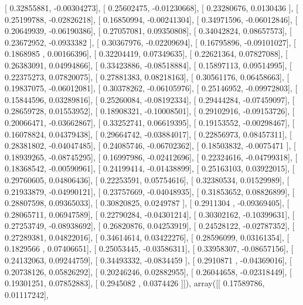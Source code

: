 \documentclass{article}
\begin{document}
       [ 0.32855881, -0.00304273],
       [ 0.25602475, -0.01230668],
       [ 0.23280676,  0.0130436 ],
       [ 0.25199788, -0.02826218],
       [ 0.16850994, -0.00241304],
       [ 0.34971596, -0.06012846],
       [ 0.20649939, -0.06190386],
       [ 0.27057081,  0.09350808],
       [ 0.34042824,  0.08657573],
       [ 0.23672952, -0.0933382 ],
       [ 0.30367976, -0.02209694],
       [ 0.16795896, -0.09101027],
       [ 0.1868985 ,  0.00166396],
       [ 0.32204419,  0.07349635],
       [ 0.22621364,  0.07827088],
       [ 0.26383091,  0.04994866],
       [ 0.33423886, -0.08518884],
       [ 0.15897113,  0.09514995],
       [ 0.22375273,  0.07820075],
       [ 0.27881383,  0.08218163],
       [ 0.30561176,  0.06458663],
       [ 0.19837075, -0.06012081],
       [ 0.30378262, -0.06105976],
       [ 0.25146952, -0.09972803],
       [ 0.15844596,  0.03289816],
       [ 0.25260084, -0.08192334],
       [ 0.29444284, -0.07459097],
       [ 0.28659728,  0.01553952],
       [ 0.18908321, -0.10008501],
       [ 0.29102916, -0.09153726],
       [ 0.20066471, -0.03662867],
       [ 0.33252741,  0.06619395],
       [ 0.19153552, -0.00298467],
       [ 0.16078824,  0.04379438],
       [ 0.29664742, -0.03884017],
       [ 0.22856973,  0.08457311],
       [ 0.28381802, -0.04047485],
       [ 0.24085746, -0.06702362],
       [ 0.18503832, -0.0075471 ],
       [ 0.18939265, -0.08745295],
       [ 0.16997986, -0.02412696],
       [ 0.22324616, -0.04799318],
       [ 0.18368542, -0.00590961],
       [ 0.24199414, -0.01438899],
       [ 0.25163103,  0.03922015],
       [ 0.29760605,  0.04806436],
       [ 0.22253591,  0.05754616],
       [ 0.32380534,  0.01529989],
       [ 0.21933879, -0.04990121],
       [ 0.23757669, -0.04048935],
       [ 0.31853652,  0.08826899],
       [ 0.28807598,  0.09365033],
       [ 0.30820825,  0.0249787 ],
       [ 0.2911304 , -0.09369405],
       [ 0.28065711,  0.06947589],
       [ 0.22790284, -0.04301214],
       [ 0.30302162, -0.10399631],
       [ 0.27253749, -0.08938692],
       [ 0.26820876,  0.04253919],
       [ 0.24528122, -0.02787352],
       [ 0.27289381,  0.04822016],
       [ 0.34614614,  0.03422276],
       [ 0.28596099,  0.03161354],
       [ 0.1829566 ,  0.07406651],
       [ 0.25053445, -0.03586311],
       [ 0.33958307, -0.08657156],
       [ 0.24132063,  0.09244759],
       [ 0.34493332, -0.0834459 ],
       [ 0.2910871 , -0.04369016],
       [ 0.20738126,  0.05826292],
       [ 0.20246246,  0.02882955],
       [ 0.26044658, -0.02318449],
       [ 0.19301251,  0.07852883],
       [ 0.2945082 ,  0.0374426 ]]), array([[ 0.17589786,  0.01117242],
\end{document}
